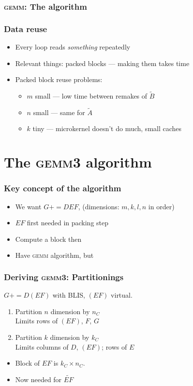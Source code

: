 \documentclass{beamer}
\newcommand*{\pluseq}{\mathrel{{+}{=}}}
\newcommand*{\gemmt}{{\textsc{gemm3}}}
\newcommand*{\gemm}{{\textsc{gemm}}}
\begin{document}
\begin{frame}
  \frametitle{\gemm{}: The algorithm}
  \begin{adjustbox}{max size={!}{0.87\textheight},center}
  \begin{tikzpicture}
    
  \end{tikzpicture}
  \end{adjustbox}
\end{frame}


\begin{frame}
  \frametitle{Data reuse}
  \begin{itemize}
  \item Every loop reads \emph{something} repeatedly
  \item Relevant things: packed blocks --- making them takes time
  \item Packed block reuse problems:
    \begin{itemize}
    \item $m$ small --- low time between remakes of $\widetilde{B}$
    \item $n$ small --- same for $\widetilde{A}$
    \item $k$ tiny --- microkernel doesn't do much, small caches
    \end{itemize}
  \end{itemize}
\end{frame}

\section[\gemmt{}]{The \gemmt{} algorithm}
\begin{frame}
  \frametitle{Key concept of the algorithm}
  \begin{itemize}
  \item We want $G \pluseq DEF$, (dimensions: $m, k, l, n$ in order)
  \item $EF$ first needed in packing step
  \item Compute a block then
  \item Have \gemm{} algorithm, but
  \end{itemize}
\end{frame}

\begin{frame}
  \frametitle{Deriving \gemmt{}: Partitionings}
  $G \pluseq D(EF)$ with BLIS, $(EF)$ virtual.
  \begin{enumerate}
  \item Partition $n$ dimension by $n_C$\\
    Limits rows of $(EF)$, $F$, $G$
  \item Partition $k$ dimension by $k_C$\\
    Limits columns of $D$, $(EF)$; rows of $E$
  \end{enumerate}
  \begin{itemize}
  \item Block of $EF$ is $k_C \times n_C$.
  \item Now needed for $\tilde{EF}$
  \end{itemize}
\end{frame}
\end{document}

